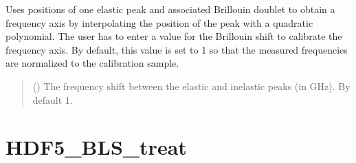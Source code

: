 \documentclass[letterpaper,10pt,english]{sphinxmanual}
\begin{document}
\begin{fulllineitems}
\begin{fulllineitems}
\end{fulllineitems}


\begin{fulllineitems}
\label{\detokenize{source/_autosummary/HDF5_BLS_analyse.Analyse_VIPA:HDF5_BLS_analyse.Analyse_VIPA.interpolate_on_one_order}}
\pysigstartsignatures
\pysiglinewithargsret
{}
{}
{}
\pysigstopsignatures
\sphinxAtStartPar
Uses positions of one elastic peak and associated Brillouin doublet to obtain a frequency axis by interpolating the position of the peak with a quadratic polynomial. The user has to enter a value for the Brillouin shift to calibrate the frequency axis. By default, this value is set to 1 so that the measured frequencies are normalized to the calibration sample.
\begin{quote}\begin{description}
\sphinxAtStartPar
{} () \textendash{} The frequency shift between the elastic and inelastic peaks (in GHz). By default 1.

\end{description}\end{quote}

\end{fulllineitems}


\end{fulllineitems}


\sphinxstepscope


\chapter{HDF5\_BLS\_treat}
\label{\detokenize{source/summary_HDF5_BLS_treat:hdf5-bls-treat}}\label{\detokenize{source/summary_HDF5_BLS_treat:api-treat}}\label{\detokenize{source/summary_HDF5_BLS_treat::doc}}
\sphinxAtStartPar
{}
\end{document}
